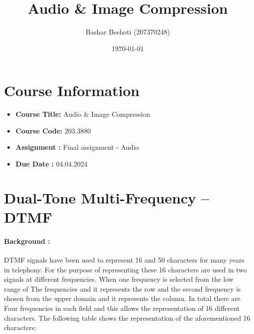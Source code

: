 \documentclass[letterpaper, 12pt]{article}
\title{Audio \& Image Compression}
\author{Bashar Beshoti (207370248)
}
\date{\today}
\begin{document}
\maketitle

\section*{Course Information}
\begin{itemize}
    \item \textbf{Course Title:} Audio \& Image Compression  %
    \item \textbf{Course Code:} 203.3880
    \item \textbf{Assignment :} Final assignment - Audio
    \item \textbf{Due Date : } 04.04.2024

\end{itemize}



\newpage

\section{ Dual-Tone Multi-Frequency – DTMF}
\paragraph{Background :}DTMF signals have been used to represent 16 and 50 characters for many years in telephony.
For the purpose of representing these 16 characters are used in two signals at different frequencies. When one frequency is selected from the low range of
The frequencies and it represents the row and the second frequency is chosen from the upper domain and it represents the column. In total there are
Four frequencies in each field and this allows the representation of 16 different characters.
The following table shows the representation of the aforementioned 16 characters:
\end{document}
